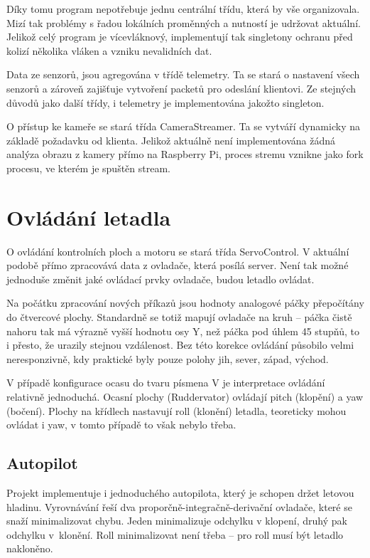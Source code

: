\documentclass[a4paper,oneside,12pt]{report}
\begin{document}
Díky tomu program nepotřebuje jednu centrální třídu, která by vše organizovala.
Mizí tak problémy s řadou lokálních proměnných a nutností je udržovat aktuální.
Jelikož celý program je vícevláknový, implementují tak singletony ochranu před kolizí několika vláken a vzniku nevalidních dat.

Data ze senzorů, jsou agregována v třídě telemetry.
Ta se stará o nastavení všech senzorů a zároveň zajišťuje vytvoření packetů pro odeslání klientovi.
Ze stejných důvodů jako další třídy, i telemetry je implementována jakožto singleton.

O přístup ke kameře se stará třída CameraStreamer.
Ta se vytváří dynamicky na základě požadavku od klienta.
Jelikož aktuálně není implementována žádná analýza obrazu z kamery přímo na Raspberry Pi, proces stremu vznikne jako fork procesu, ve kterém je spuštěn stream.

\section{Ovládání letadla}

O ovládání kontrolních ploch a motoru se stará třída ServoControl.
V aktuální podobě přímo zpracovává data z ovladače, která posílá server.
Není tak možné jednoduše změnit jaké ovládací prvky ovladače, budou letadlo ovládat.

Na počátku zpracování nových příkazů jsou hodnoty analogové páčky přepočítány do čtvercové plochy.
Standardně se totiž mapují ovladače na kruh -- páčka čistě nahoru tak má výrazně vyšší hodnotu osy Y, než páčka pod úhlem 45 stupňů, to i přesto, že urazily stejnou vzdálenost.
Bez této korekce ovládání působilo velmi neresponzivně, kdy praktické byly pouze polohy jih, sever, západ, východ.

V případě konfigurace ocasu do tvaru písmena V je interpretace ovládání relativně jednoduchá.
Ocasní plochy (Ruddervator) ovládají pitch (klopění) a yaw (bočení).
Plochy na křídlech nastavují roll (klonění) letadla, teoreticky mohou ovládat i yaw, v tomto případě to však nebylo třeba.

\subsection{Autopilot}

Projekt implementuje i jednoduchého autopilota, který je schopen držet letovou hladinu.
Vyrovnávání řeší dva proporčně-integračně-derivační ovladače, které se snaží minimalizovat chybu.
Jeden minimalizuje odchylku v klopení, druhý pak odchylku v~klonění.
Roll minimalizovat není třeba -- pro roll musí být letadlo nakloněno.
\end{document}
